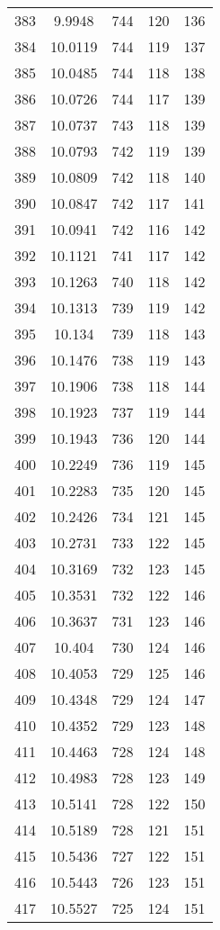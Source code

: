 \documentclass[12pt,a4paper]{article}
\begin{document}
\begin{tabular}{r|cccc}
	383 & 9.9948 & 744 & 120 & 136 \\
	384 & 10.0119 & 744 & 119 & 137 \\
	385 & 10.0485 & 744 & 118 & 138 \\
	386 & 10.0726 & 744 & 117 & 139 \\
	387 & 10.0737 & 743 & 118 & 139 \\
	388 & 10.0793 & 742 & 119 & 139 \\
	389 & 10.0809 & 742 & 118 & 140 \\
	390 & 10.0847 & 742 & 117 & 141 \\
	391 & 10.0941 & 742 & 116 & 142 \\
	392 & 10.1121 & 741 & 117 & 142 \\
	393 & 10.1263 & 740 & 118 & 142 \\
	394 & 10.1313 & 739 & 119 & 142 \\
	395 & 10.134 & 739 & 118 & 143 \\
	396 & 10.1476 & 738 & 119 & 143 \\
	397 & 10.1906 & 738 & 118 & 144 \\
	398 & 10.1923 & 737 & 119 & 144 \\
	399 & 10.1943 & 736 & 120 & 144 \\
	400 & 10.2249 & 736 & 119 & 145 \\
	401 & 10.2283 & 735 & 120 & 145 \\
	402 & 10.2426 & 734 & 121 & 145 \\
	403 & 10.2731 & 733 & 122 & 145 \\
	404 & 10.3169 & 732 & 123 & 145 \\
	405 & 10.3531 & 732 & 122 & 146 \\
	406 & 10.3637 & 731 & 123 & 146 \\
	407 & 10.404 & 730 & 124 & 146 \\
	408 & 10.4053 & 729 & 125 & 146 \\
	409 & 10.4348 & 729 & 124 & 147 \\
	410 & 10.4352 & 729 & 123 & 148 \\
	411 & 10.4463 & 728 & 124 & 148 \\
	412 & 10.4983 & 728 & 123 & 149 \\
	413 & 10.5141 & 728 & 122 & 150 \\
	414 & 10.5189 & 728 & 121 & 151 \\
	415 & 10.5436 & 727 & 122 & 151 \\
	416 & 10.5443 & 726 & 123 & 151 \\
	417 & 10.5527 & 725 & 124 & 151 \\

\end{tabular}
\end{document}
